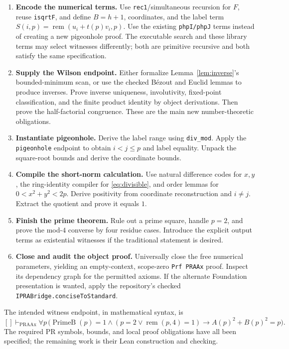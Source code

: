 \documentclass[11pt,letterpaper]{article}
\theoremstyle{definition}
\theoremstyle{remark}
\newcommand{\PrimeB}{\operatorname{PrimeB}}
\newcommand{\remd}{\operatorname{rem}}
\begin{document}
\begin{enumerate}
\item \textbf{Encode the numerical terms.}
Use \texttt{rec1}/simultaneous recursion for \(F\), reuse
\texttt{isqrtF}, and define \(B=h+1\), coordinates, and
the label term \(S(i,p)=\remd(u_i+t(p)v_i,p)\).
Use the existing \texttt{phpI/phpJ} terms instead of creating a new
pigeonhole proof. The executable search and these library terms may
select witnesses differently; both are primitive recursive and both
satisfy the same specification.

\item \textbf{Supply the Wilson endpoint.}
Either formalize Lemma~\ref{lem:inverse}'s bounded-minimum scan, or use
the checked B\'ezout and Euclid lemmas to produce inverses.
Prove inverse uniqueness, involutivity, fixed-point classification,
and the finite product identity by object derivations.
Then prove the half-factorial congruence. These are the main new
number-theoretic obligations.

\item \textbf{Instantiate pigeonhole.}
Derive the label range using \texttt{div\_mod}. Apply the
\texttt{pigeonhole} endpoint to obtain \(i<j\le p\) and label equality.
Unpack the square-root bounds and derive the coordinate bounds.

\item \textbf{Compile the short-norm calculation.}
Use natural difference codes for \(x,y\), the ring-identity compiler for
\eqref{eq:divisible}, and order lemmas for
\(0<x^2+y^2<2p\).
Derive positivity from coordinate reconstruction and \(i\ne j\).
Extract the quotient and prove it equals \(1\).

\item \textbf{Finish the prime theorem.}
Rule out a prime square, handle \(p=2\), and prove the mod-\(4\)
converse by four residue cases. Introduce the explicit output terms
as existential witnesses if the traditional statement is desired.

\item \textbf{Close and audit the object proof.}
Universally close the free numerical parameters, yielding an empty-context,
scope-zero \texttt{Prf PRAAx} proof. Inspect its dependency graph for the
permitted axioms. If the alternate Foundation presentation is wanted,
apply the repository's checked \texttt{IPRABridge.conciseToStandard}.
\end{enumerate}

The intended witness endpoint, in mathematical syntax, is
\[
 []\vdash_{\mathrm{PRAAx}}\forall p\,
 \bigl(\PrimeB(p)=1\wedge(p=2\vee\remd(p,4)=1)
 \to A(p)^2+B(p)^2=p\bigr).
\]
The required PR symbols, bounds, and local proof obligations have all
been specified; the remaining work is their Lean construction and checking.
\end{document}
